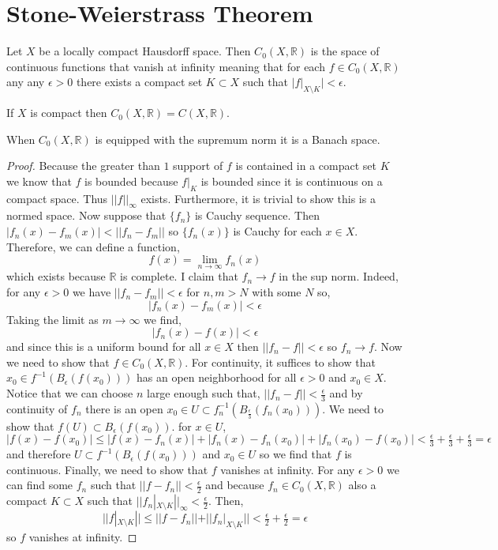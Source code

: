 \documentclass[12pt]{article}
\newcommand{\R}{\mathbb{R}}
\begin{document}
\section{Stone-Weierstrass Theorem}

\begin{defn}
Let $X$ be a locally compact Hausdorff space. Then $C_0(X, \R)$ is the space of continuous functions that vanish at infinity meaning that for each $f \in C_0(X, \R)$ any any $\epsilon > 0$ there exists a compact set $K \subset X$ such that $|f|_{X \setminus K}| < \epsilon$. 
\end{defn}

\begin{rmk}
If $X$ is compact then $C_0(X, \R) = C(X, \R)$.
\end{rmk}

\begin{prop}
When $C_0(X, \R)$ is equipped with the supremum norm it is a Banach space.
\end{prop}

\begin{proof}
Because the greater than $1$ support of $f$ is contained in a compact set $K$ we know that $f$ is bounded because $f|_K$ is bounded since it is continuous on a compact space. Thus $|| f ||_\infty$ exists. Furthermore, it is trivial to show this is a normed space. Now suppose that $\{ f_n \}$ is Cauchy sequence. Then $| f_n(x) - f_m(x) | < || f_n - f_m ||$ so $\{ f_n(x) \}$ is Cauchy for each $x \in X$. Therefore, we can define a function,
\[ f(x) = \lim_{n \to \infty} f_n(x) \]
which exists because $\R$ is complete. I claim that $f_n \to f$ in the sup norm. Indeed, for any $\epsilon > 0$ we have $|| f_n - f_m || < \epsilon$ for $n,m > N$ with some $N$ so,
\[ |f_n(x) - f_m(x) | < \epsilon \] 
Taking the limit as $m \to \infty$ we find,
\[ |f_n(x) - f(x) | < \epsilon \]
and since this is a uniform bound for all $x \in X$ then $|| f_n - f || < \epsilon$ so $f_n \to f$. Now we need to show that $f \in C_0(X, \R)$. For continuity, it suffices to show that $x_0 \in f^{-1}(B_\epsilon(f(x_0)))$ has an open neighborhood for all $\epsilon > 0$ and $x_0 \in X$. Notice that we can choose $n$ large enough such that, $|| f_n - f || < \tfrac{\epsilon}{3}$ and by continuity of $f_n$ there is an open $x_0 \in U \subset f_n^{-1}(B_{\frac{\epsilon}{3}}(f_n(x_0)))$. We need to show that $f(U) \subset B_\epsilon(f(x_0))$. for $x \in U$,
\[ | f(x) - f(x_0) | \le |f(x) - f_n(x)| + |f_n(x) - f_n(x_0)| + |f_n(x_0) - f(x_0)| < \tfrac{\epsilon}{3} + \tfrac{\epsilon}{3} + \tfrac{\epsilon}{3} = \epsilon \]
and therefore $U \subset f^{-1}(B_\epsilon(f(x_0)))$ and $x_0 \in U$ so we find that $f$ is continuous. Finally, we need to show that $f$ vanishes at infinity. For any $\epsilon > 0$ we can find some $f_n$ such that $||f - f_n || < \tfrac{\epsilon}{2}$ and because $f_n \in C_0(X, \R)$ also a compact $K \subset X$ such that $|| f_n|_{X\setminus K} ||_{\infty} < \tfrac{\epsilon}{2}$. Then,
\[ || f |_{X \setminus K} || \le || f - f_n || + || f_n |_{X \setminus K} || < \tfrac{\epsilon}{2} + \tfrac{\epsilon}{2} = \epsilon \]
so $f$ vanishes at infinity.
\end{proof}
\end{document}
